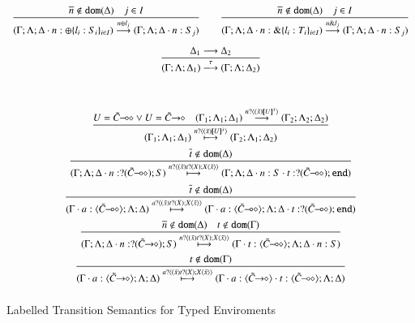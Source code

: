 \begin{figure}
\[\begin{array}{c}
		\tree{
			\dual{n} \notin \dom{\Delta} \quad j \in I
		}{
			(\Gamma; \Lambda; \Delta \cat n: \btsel{l_i: S_i}_{i \in I}) \by{\bactsel{n}{l_j}} (\Gamma; \Lambda; \Delta \cat n:S_j)
		}
		\qquad
		\tree{
			\dual{n} \notin \dom{\Delta} \quad j \in I
		}{
			(\Gamma; \Lambda; \Delta \cat n: \btbra{l_i: T_i}_{i \in I}) \by{\bactbra{n}{l_j}} (\Gamma; \Lambda; \Delta \cat n:S_j)
		}
		\\[8mm]

		\tree{
			\Delta_1 \red \Delta_2
		}{
			(\Gamma; \Lambda; \Delta_1) \by{\tau} (\Gamma; \Lambda; \Delta_2)
		}

		\vspace{12mm}\\


		\tree{
			U = \lhot{\tilde{C}} \vee U = \shot{\tilde{C}}
			\quad
			(\Gamma_1; \Lambda_1; \Delta_1) \by{\bactinp{n}{\abs{\tilde{x}}{\map{U}^{\tilde{x}}}}} (\Gamma_2; \Lambda_2; \Delta_2)
		}{
			(\Gamma_1; \Lambda_1; \Delta_1) \hby{\bactinp{n}{\abs{\tilde{x}}{\map{U}^{\tilde{x}}}}} (\Gamma_2; \Lambda_1; \Delta_2)
		}
		\\[6mm]

		\tree{
			\dual{t} \notin \dom{\Delta}
		}{
			(\Gamma; \Lambda; \Delta \cat n: \btinp{\lhot{\tilde{C}}} S) \hby{\bactinp{n}{\abs{\tilde{x}}{\binp{t}{X} \appl{X}{\tilde{x}}}}} (\Gamma; \Lambda; \Delta \cat n: S \cat t: \btinp{\lhot{\tilde{C}}} \tinact)
		}
		\\[6mm]


		\tree{
			\dual{t} \notin \dom{\Delta}
		}{
		(\Gamma \cat a: \chtype{\lhot{\tilde{C}}}; \Lambda; \Delta) \hby{\bactinp{a}{\abs{\tilde{x}}{\binp{t}{X} \appl{X}{\tilde{x}}}}} (\Gamma \cat a: \chtype{\lhot{\tilde{C}}}; \Lambda; \Delta \cat t: \btinp{\lhot{\tilde{C}}}
 \tinact)
		}
		\\[6mm]

		\tree{
			\dual{n} \notin \dom{\Delta} \quad t \notin \dom{\Gamma}
		}{
			(\Gamma; \Lambda; \Delta \cat n: \btinp{\shot{\tilde{C}}} S) \hby{\bactinp{n}{\abs{\tilde{x}}{\binp{t}{X} \appl{X}{\tilde{x}}}}} (\Gamma \cat t: \chtype{\lhot{\tilde{C}}}; \Lambda; \Delta \cat n: S)
		}
		\\[6mm]
		\tree{
			t \notin \dom{\Gamma}
		}{
			(\Gamma \cat a: \chtype{\shot{\tilde{C}}}; \Lambda; \Delta) \hby{\bactinp{a}{\abs{\tilde{x}}{\binp{t}{X} \appl{X}{\tilde{x}}}}} (\Gamma \cat a: \chtype{\shot{\tilde{C}}} \cat t: \chtype{\lhot{\tilde{C}}}; \Lambda; \Delta)
		}
		\\[6mm]
	\end{array}
	\]
	\caption{Labelled Transition Semantics for Typed Enviroments \label{fig:envLTS}}
\end{figure}
